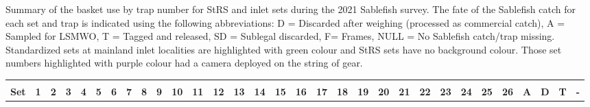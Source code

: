 \documentclass[12pt]{article}\usepackage[]{graphicx}\usepackage[]{color}
\begin{document}
\begin{appendices}
Summary of the basket use by trap number for StRS and inlet sets during the 2021 Sablefish survey. The fate of the Sablefish catch for each set and trap is indicated using the following abbreviations: D = Discarded after weighing (processed as commercial catch), A = Sampled for LSMWO, T = Tagged and released, SD = Sublegal discarded, F= Frames, NULL = No Sablefish catch/trap missing. Standardized sets at mainland inlet localities are highlighted with green colour and StRS sets have no background colour. Those set numbers highlighted with purple colour had a camera deployed on the string of gear.
\begin{landscape}\begingroup\fontsize{6}{8}\selectfont
\begin{longtable}{>{\raggedright\arraybackslash}p{0.8cm}>{\raggedright\arraybackslash}p{0.3cm}>{\raggedright\arraybackslash}p{0.3cm}>{\raggedright\arraybackslash}p{0.3cm}>{\raggedright\arraybackslash}p{0.3cm}>{\raggedright\arraybackslash}p{0.3cm}>{\raggedright\arraybackslash}p{0.3cm}>{\raggedright\arraybackslash}p{0.3cm}>{\raggedright\arraybackslash}p{0.3cm}>{\raggedright\arraybackslash}p{0.3cm}>{\raggedright\arraybackslash}p{0.4cm}>{\raggedright\arraybackslash}p{0.4cm}>{\raggedright\arraybackslash}p{0.4cm}>{\raggedright\arraybackslash}p{0.4cm}>{\raggedright\arraybackslash}p{0.4cm}>{\raggedright\arraybackslash}p{0.4cm}>{\raggedright\arraybackslash}p{0.4cm}>{\raggedright\arraybackslash}p{0.4cm}>{\raggedright\arraybackslash}p{0.4cm}>{\raggedright\arraybackslash}p{0.4cm}>{\raggedright\arraybackslash}p{0.4cm}>{\raggedright\arraybackslash}p{0.4cm}>{\raggedright\arraybackslash}p{0.4cm}>{\raggedright\arraybackslash}p{0.4cm}>{\raggedright\arraybackslash}p{0.4cm}>{\raggedright\arraybackslash}p{0.4cm}>{\raggedright\arraybackslash}p{0.4cm}>{\raggedleft\arraybackslash}p{0.2cm}>{\raggedleft\arraybackslash}p{0.2cm}>{\raggedleft\arraybackslash}p{0.2cm}>{\raggedleft\arraybackslash}p{0.2cm}}
\toprule
\multicolumn{1}{c}{\textbf{ }} & \multicolumn{26}{c}{\textbf{Trap}} & \multicolumn{4}{c}{\textbf{Total}} \\
\cmidrule(l{3pt}r{3pt}){2-27} \cmidrule(l{3pt}r{3pt}){28-31}
\textbf{Set} & \textbf{1} & \textbf{2} & \textbf{3} & \textbf{4} & \textbf{5} & \textbf{6} & \textbf{7} & \textbf{8} & \textbf{9} & \textbf{10} & \textbf{11} & \textbf{12} & \textbf{13} & \textbf{14} & \textbf{15} & \textbf{16} & \textbf{17} & \textbf{18} & \textbf{19} & \textbf{20} & \textbf{21} & \textbf{22} & \textbf{23} & \textbf{24} & \textbf{25} & \textbf{26} & \textbf{A} & \textbf{D} & \textbf{T} & \textbf{-}\\

\end{longtable}
\end{landscape}
\end{appendices}
\end{document}
